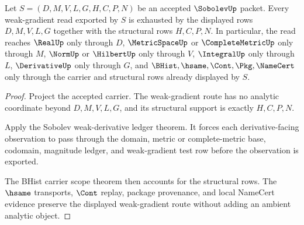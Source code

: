 \begin{theorem}
\label{thm:sobolev-weak-gradient-ledger-exhaustion}
Let $S=(D,M,V,L,G,H,C,P,N)$ be an accepted $\SobolevUp$ packet. Every weak-gradient read exported by $S$ is exhausted by the displayed rows $D,M,V,L,G$ together with the structural rows $H,C,P,N$. In particular, the read reaches $\RealUp$ only through $D$, $\MetricSpaceUp$ or $\CompleteMetricUp$ only through $M$, $\NormUp$ or $\HilbertUp$ only through $V$, $\IntegralUp$ only through $L$, $\DerivativeUp$ only through $G$, and $\BHist,\hsame,\Cont,\Pkg,\NameCert$ only through the carrier and structural rows already displayed by $S$.
\end{theorem}
\begin{proof}
Project the accepted carrier. The weak-gradient route has no analytic coordinate beyond $D,M,V,L,G$, and its structural support is exactly $H,C,P,N$.

Apply the Sobolev weak-derivative ledger theorem. It forces each derivative-facing observation to pass through the domain, metric or complete-metric base, codomain, magnitude ledger, and weak-gradient test row before the observation is exported.

The BHist carrier scope theorem then accounts for the structural rows. The $\hsame$ transports, $\Cont$ replay, package provenance, and local NameCert evidence preserve the displayed weak-gradient route without adding an ambient analytic object.
\end{proof}

